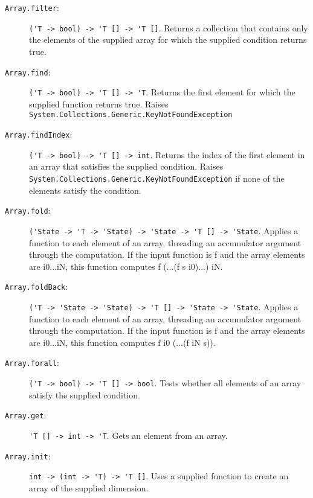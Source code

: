 \begin{description}
\item[\texttt{Array.filter}:] \lstinline{('T -> bool) -> 'T [] -> 'T []}. Returns a collection that contains only the elements of the supplied array for which the supplied condition returns true.
\item[\texttt{Array.find}:] \lstinline{('T -> bool) -> 'T [] -> 'T}. Returns the first element for which the supplied function returns true. Raises \lstinline{System.Collections.Generic.KeyNotFoundException}  
\item[\texttt{Array.findIndex}:] \lstinline{('T -> bool) -> 'T [] -> int}. Returns the index of the first element in an array that satisfies the supplied condition. Raises \lstinline{System.Collections.Generic.KeyNotFoundException} if none of the elements satisfy the condition.
\item[\texttt{Array.fold}:] \lstinline{('State -> 'T -> 'State) -> 'State -> 'T [] -> 'State}. Applies a function to each element of an array, threading an accumulator argument through the computation. If the input function is f and the array elements are i0...iN, this function computes f (...(f s i0)...) iN.
\item[\texttt{Array.foldBack}:] \lstinline{('T -> 'State -> 'State) -> 'T [] -> 'State -> 'State}. Applies a function to each element of an array, threading an accumulator argument through the computation. If the input function is f and the array elements are i0...iN, this function computes f i0 (...(f iN s)).
\item[\texttt{Array.forall}:] \lstinline{('T -> bool) -> 'T [] -> bool}. Tests whether all elements of an array satisfy the supplied condition.
\item[\texttt{Array.get}:] \lstinline{'T [] -> int -> 'T}. Gets an element from an array.
\item[\texttt{Array.init}:] \lstinline{int -> (int -> 'T) -> 'T []}. Uses a supplied function to create an array of the supplied dimension.

\end{description}
